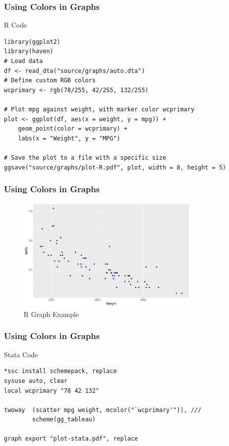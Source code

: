 \documentclass[aspectratio=1610]{beamer}
\begin{document}
\begin{frame}[fragile]
    \frametitle{Using Colors in Graphs}
    \begin{tblock}{R Code}
        \footnotesize
        \begin{verbatim}
library(ggplot2)
library(haven)
# Load data
df <- read_dta("source/graphs/auto.dta")
# Define custom RGB colors
wcprimary <- rgb(78/255, 42/255, 132/255)

# Plot mpg against weight, with marker color wcprimary
plot <- ggplot(df, aes(x = weight, y = mpg)) +
    geom_point(color = wcprimary) +
    labs(x = "Weight", y = "MPG")

# Save the plot to a file with a specific size
ggsave("source/graphs/plot-R.pdf", plot, width = 8, height = 5)
        \end{verbatim}
    \end{tblock}
\end{frame}



\begin{frame}[fragile]
    \frametitle{Using Colors in Graphs}
    \begin{figure}
        \centering
        \includegraphics[width=0.8\textwidth]{graphs/plot-R.pdf}
        \caption{R Graph Example}
        \label{fig:graph-R}
    \end{figure}
\end{frame}

\begin{frame}[fragile]
    \frametitle{Using Colors in Graphs}
    \begin{tblock}{Stata Code}
        \begin{verbatim}
*ssc install schemepack, replace
sysuse auto, clear
local wcprimary "78 42 132"

twoway 	(scatter mpg weight, mcolor("`wcprimary'")), ///
        scheme(gg_tableau)
        
graph export "plot-stata.pdf", replace
        \end{verbatim}
    \end{tblock}
\end{frame}
\end{document}
